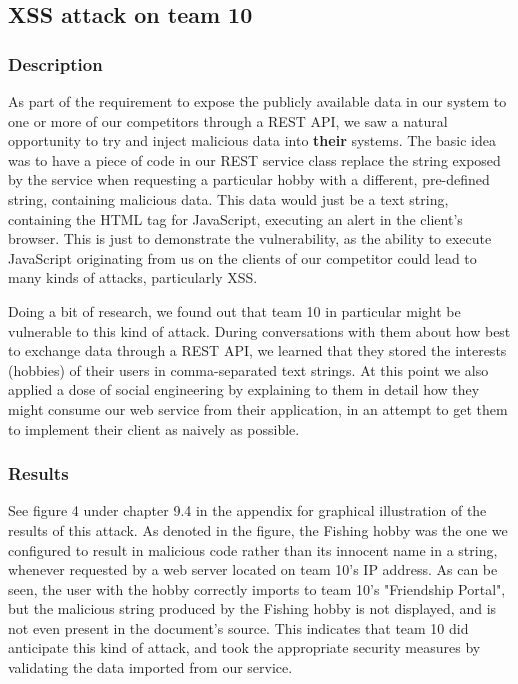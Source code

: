 \documentclass[a4paper]{article}
\begin{document}

\subsection{XSS attack on team 10}
\subsubsection{Description}
As part of the requirement to expose the publicly available data in our system to one or more of our competitors through a REST API, we saw a natural opportunity to try and inject malicious data into \textbf{their} systems. The basic idea was to have a piece of code in our REST service class replace the string exposed by the service when requesting a particular hobby with a different, pre-defined string, containing malicious data. This data would just be a text string, containing the HTML tag for JavaScript, executing an alert in the client's browser. This is just to demonstrate the vulnerability, as the ability to execute JavaScript originating from us on the clients of our competitor could lead to many kinds of attacks, particularly XSS.

Doing a bit of research, we found out that team 10 in particular might be vulnerable to this kind of attack. During conversations with them about how best to exchange data through a REST API, we learned that they stored the interests (hobbies) of their users in comma-separated text strings. At this point we also applied a dose of social engineering by explaining to them in detail how they might consume our web service from their application, in an attempt to get them to implement their client as naively as possible.


\subsubsection{Results}
See figure 4 under chapter 9.4 in the appendix for graphical illustration of the results of this attack. As denoted in the figure, the Fishing hobby was the one we configured to result in malicious code rather than its innocent name in a string, whenever requested by a web server located on team 10's IP address. As can be seen, the user with the hobby correctly imports to team 10's "Friendship Portal", but the malicious string produced by the Fishing hobby is not displayed, and is not even present in the document's source. This indicates that team 10 did anticipate this kind of attack, and took the appropriate security measures by validating the data imported from our service.
\end{document}
